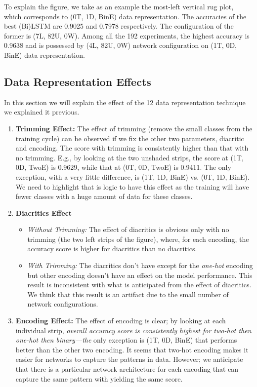 To explain the figure, we take as an example the most-left vertical rug plot, which corresponds to (0T, 1D, BinE) data representation. The accuracies of the best (Bi)LSTM are 0.9025 and 0.7978 respectively. The configuration of the former is (7L, 82U, 0W). Among all the 192 experiments, the highest accuracy is 0.9638 and is possessed by (4L, 82U, 0W) network configuration on (1T, 0D, BinE) data representation.

\subsection{Data Representation Effects}

In this section we will explain the effect of the 12 data representation technique we explained it previous.

\begin{enumerate}
  \item \textbf{Trimming Effect:} The effect of trimming (remove the small classes from the training cycle) can be observed if we fix the other two parameters, diacritic and encoding. The score with trimming is consistently higher than that with no trimming. E.g., by looking at the two unshaded strips, the score at (1T, 0D, TwoE) is 0.9629, while that at (0T, 0D, TwoE) is 0.9411. The only exception, with a very little difference, is (1T, 1D, BinE) vs. (0T, 1D, BinE). We need to highlight that is logic to have this effect as the training will have fewer classes with a huge amount of data for these classes.
  \item \textbf{Diacritics Effect}
  \begin{itemize}
    \item \textit{Without Trimming:} The effect of diacritics is obvious only with no trimming (the two left strips of the figure), where, for each encoding, the accuracy score is higher for diacritics than no diacritics.
    \item \textit{With Trimming:} The diacritics don't have except for the \textit{one-hot} encoding but other encoding doesn't have an effect on the model performance. This result is inconsistent with what is anticipated from the effect of diacritics. We think that this result is an artifact due to the small number of network configurations.

  \end{itemize} 
  \item \textbf{Encoding Effect:} The effect of encoding is clear; by looking at each individual strip, \textit{overall accuracy score is consistently highest for two-hot then one-hot then binary—the} only exception is (1T, 0D, BinE) that performs better than the other two encoding. It seems that two-hot encoding makes it easier for networks to capture the patterns in data. However; we anticipate that there is a particular network architecture for each encoding that can capture the same pattern with yielding the same score.
\end{enumerate}



